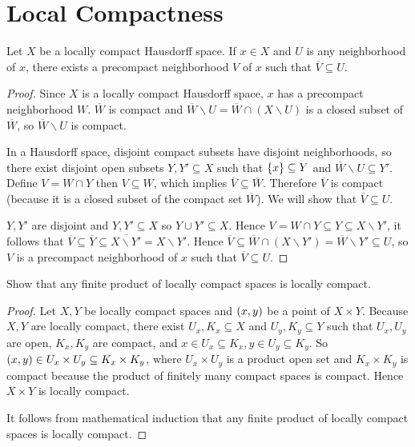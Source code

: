 \section*{Local Compactness}

\begin{lemma}{4.65}\label{lemma:4.65}
	Let $X$ be a locally compact Hausdorff space. If $x\in X$ and $U$ is any neighborhood of $x$, there exists a precompact neighborhood $V$ of $x$ such that $\overline{V} \subseteq U$.
\end{lemma}

\begin{proof}
	Since $X$ is a locally compact Hausdorff space, $x$ has a precompact neighborhood $W$. $\overline{W}$ is compact and $\overline{W}\smallsetminus U = \overline{W} \cap (X\smallsetminus U)$ is a closed subset of $\overline{W}$, so $\overline{W}\smallsetminus U$ is compact.

	In a Hausdorff space, disjoint compact subsets have disjoint neighborhoods, so there exist disjoint open subsets $Y, Y'\subseteq X$ such that $\left\{{x}\right\} \subseteq Y$ and $\overline{W}\smallsetminus U \subseteq Y'$. Define $V = W\cap Y$ then $V \subseteq W$, which implies $\overline{V} \subseteq \overline{W}$. Therefore $\overline{V}$ is compact (because it is a closed subset of the compact set $\overline{W}$). We will show that $\overline{V}\subseteq U$.

	$Y, Y'$ are disjoint and $Y, Y'\subseteq X$ so $Y\cup Y' \subseteq X$. Hence $V = W\cap Y \subseteq Y \subseteq X\smallsetminus Y'$, it follows that $\overline{V} \subseteq \overline{Y} \subseteq \overline{X\smallsetminus Y'} = X\smallsetminus Y'$. Hence $\overline{V} \subseteq \overline{W} \cap (X\smallsetminus Y') = \overline{W} \smallsetminus Y' \subseteq U$, so $V$ is a precompact neighborhood of $x$ such that $\overline{V} \subseteq U$.
\end{proof}

\begin{exercise}{4.67}
	Show that any finite product of locally compact spaces is locally compact.
\end{exercise}

\begin{proof}
	Let $X, Y$ be locally compact spaces and $\left({x, y}\right)$ be a point of $X\times Y$. Because $X, Y$ are locally compact, there exist $U_{x}, K_{x} \subseteq X$ and $U_{y}, K_{y} \subseteq Y$ such that $U_{x}, U_{y}$ are open, $K_{x}, K_{y}$ are compact, and $x\in U_{x} \subseteq K_{x}, y\in U_{y} \subseteq K_{y}$. So $\left({x, y}\right) \in U_{x}\times U_{y} \subseteq K_{x} \times K_{y}$, where $U_{x}\times U_{y}$ is a product open set and $K_{x}\times K_{y}$ is compact because the product of finitely many compact spaces is compact. Hence $X\times Y$ is locally compact.

	It follows from mathematical induction that any finite product of locally compact spaces is locally compact.
\end{proof}

